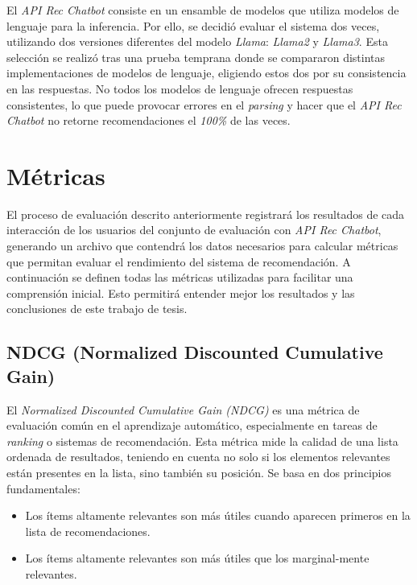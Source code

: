 \documentclass[11pt,a4paper,twoside]{thesis}
\begin{document}
El \textit{API Rec Chatbot} consiste en un ensamble de modelos que utiliza modelos de lenguaje para la inferencia. Por ello, se decidió evaluar el sistema dos veces, utilizando dos versiones diferentes del modelo \textit{Llama}: \textit{Llama2} y \textit{Llama3}. Esta selección se realizó tras una prueba temprana donde se compararon distintas implementaciones de modelos de lenguaje, eligiendo estos dos por su consistencia en las respuestas. No todos los modelos de lenguaje ofrecen respuestas consistentes, lo que puede provocar errores en el \textit{parsing} y hacer que el \textit{API Rec Chatbot} no retorne recomendaciones el \textit{100\%} de las veces.


\section{Métricas}

El proceso de evaluación descrito anteriormente registrará los resultados de cada interacción de los usuarios del conjunto de evaluación con  \textit{API Rec Chatbot}, generando un archivo que contendrá los datos necesarios para calcular métricas que permitan evaluar el rendimiento del sistema de recomendación. A continuación se definen todas las métricas utilizadas para facilitar una comprensión inicial. Esto permitirá entender mejor los resultados y las conclusiones de este trabajo de tesis.

\subsection{NDCG (Normalized Discounted Cumulative Gain)}


El \textit{Normalized Discounted Cumulative Gain (NDCG)} es una métrica de evaluación común en el aprendizaje automático, especialmente en tareas de \textit{ranking} o sistemas de recomendación. Esta métrica mide la calidad de una lista ordenada de resultados, teniendo en cuenta no solo si los elementos relevantes están presentes en la lista, sino también su posición. Se basa en dos principios fundamentales:

\begin{itemize}
	\item Los ítems altamente relevantes son más útiles cuando aparecen primeros en la lista de recomendaciones.
	\item Los ítems altamente relevantes son más útiles que los marginal-mente relevantes.
\end{itemize}
\end{document}
